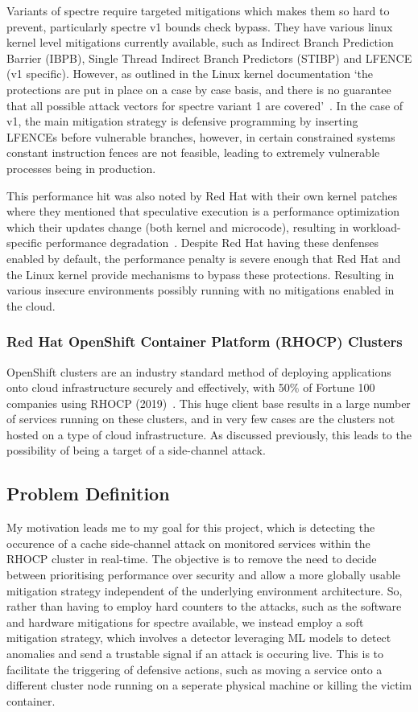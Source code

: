 \documentclass[11pt,a4paper, notitlepage]{article}
\begin{document}
Variants of spectre require targeted mitigations which makes them so hard to prevent, particularly spectre v1 bounds check bypass. They have various 
linux kernel level mitigations currently available, such as Indirect Branch Prediction Barrier (IBPB), Single Thread Indirect Branch Predictors (STIBP) 
and LFENCE (v1 specific). However, as outlined in the Linux kernel documentation `the protections are put in place on a case by case basis, and there is 
no guarantee that all possible attack vectors for spectre variant 1 are covered'~\cite{kernel_spectre}. In the case of v1, the main mitigation strategy 
is defensive programming by inserting LFENCEs before vulnerable branches, however, in certain constrained systems constant instruction fences are not 
feasible, leading to extremely vulnerable processes being in production. 

This performance hit was also noted by Red Hat with their own kernel patches where they mentioned that speculative execution is a performance 
optimization which their updates change (both kernel and microcode), resulting in workload-specific performance degradation~\cite{ redhat2019}. 
Despite Red Hat having these denfenses enabled by default, the performance penalty is severe enough that Red Hat and the Linux kernel provide mechanisms 
to bypass these protections. Resulting in various insecure environments possibly running with no mitigations enabled in the cloud.

\subsubsection{Red Hat OpenShift Container Platform (RHOCP) Clusters}
OpenShift clusters are an industry standard method of deploying applications onto cloud infrastructure securely and effectively, with 
50\% of Fortune 100 companies using RHOCP (2019)~\cite{openshift_usage}. This huge client base results in a large 
number of services running on these clusters, and in very few cases are the clusters not hosted on a type of cloud infrastructure. 
As discussed previously, this leads to the possibility of being a target of a side-channel attack.

\subsection{Problem Definition}
My motivation leads me to my goal for this project, which is detecting the occurence of a cache side-channel attack on monitored services within
the RHOCP cluster in real-time. The objective is to remove the need to decide between prioritising performance over security and allow a more globally 
usable mitigation strategy independent of the underlying environment architecture. So, rather than having to employ hard counters to the attacks, 
such as the software and hardware mitigations for spectre available, we instead employ a soft mitigation strategy, which involves a detector 
leveraging ML models to detect anomalies and send a trustable signal if an attack is occuring live. This is to facilitate the triggering of 
defensive actions, such as moving a service onto a different cluster node running on a seperate physical machine or killing the victim container. 
\end{document}
